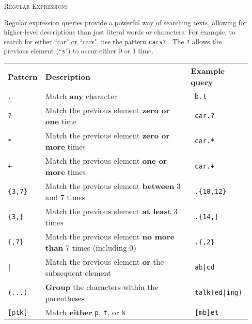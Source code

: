 \documentclass[11pt]{article}
\begin{document}
\noindent%
{\LARGE \textsc{Regular Expressions} } \\[.55ex]


\begin{spacing}{1.35}
Regular expression queries provide a powerful way of searching texts, allowing for higher-level descriptions than just literal words or characters.  For example, to search for either ``car" or ``cars", use the pattern \texttt{cars?} .
The \texttt{?} allows the previous element (``\texttt{s}") to occur either 0 or 1 time.

\vspace{1em}
\noindent \begin{tabular}{lll}
 \textbf{Pattern   } & \textbf{Description}                                                             & \textbf{Example query}  \\
 \texttt{.         } & Match \textbf{any} character                                                     & \texttt{ b.t         }  \\
 \texttt{?         } & Match the previous element \textbf{zero or one} time                             & \texttt{ car.?       }  \\
 \texttt{*         } & Match the previous element \textbf{zero or more} times                           & \texttt{ car.*       }  \\
 \texttt{+         } & Match the previous element \textbf{one or more} times                            & \texttt{ car.+       }  \\
 \texttt{\{3,7\}   } & Match the previous element \textbf{between} 3 and 7 times                        & \texttt{ .\{10,12\}  }  \\
 \texttt{\{3,\}    } & Match the previous element \textbf{at least} 3 times                             & \texttt{ .\{14,\}    }  \\
 \texttt{\{,7\}    } & {\footnotesize Match the previous element \textbf{no more than} 7 times (including 0)} & \texttt{ .\{,2\} }  \\
 \texttt{|         } & Match the previous element \textbf{or} the subsequent element                    & \texttt{ ab|cd       }  \\
 \texttt{(...)     } & \textbf{Group} the characters within the parentheses                             & \texttt{ talk(ed|ing)}  \\
 \texttt{[ptk]     } & Match \textbf{either} \texttt{p}, \texttt{t}, or \texttt{k}                      & \texttt{ [mb]et      }  \\

\end{tabular}
\end{spacing}
\end{document}
